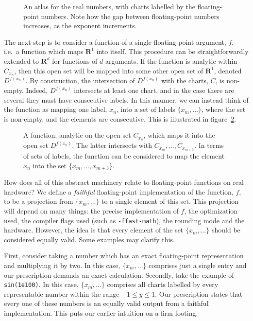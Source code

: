 \documentclass[prd,twocolumn,amsmath,amssymb,nofootinbib,eqsecnum]{revtex4-1}
\newcommand{\code}[1]{{\tt #1}}
\newcommand{\ie}{i.e.}
\newcommand{\fig}[1]{figure~\ref{fig:#1}}
\begin{document}
\begin{figure}[h]
\begin{center}
\resizebox{25em}{!}{}
\caption{An atlas for the real numbers, with charts labelled by the floating-point numbers. Note how the gap between floating-point numbers increases, as the exponent increments.}
\label{fig:R1}
\end{center}
\end{figure}

The next step is to consider a function of a single floating-point argument, $f$, \ie\ a function which maps $\mathbf{R}^1$ into itself. This procedure can be straightforwardly extended to $\mathbf{R}^d$ for functions of $d$ arguments. If the function is analytic within $C_{x_n}$, then this open set will be mapped into some other open set of $\mathbf{R}^1$, denoted $D^{f(x_n)}$. By construction, the intersection of $D^{f(x_n)}$ with the charts, $C$, is non-empty. Indeed, $D^{f(x_n)}$ intersects at least one chart, and in the case there are several they must have consecutive labels. In this manner, we can instead think of the function as mapping one label, $x_n$, into a set of labels $\{x_{m}, \ldots\}$, where the set is non-empty, and the elements are consecutive. This is illustrated in \fig{Function}.

\begin{figure}[h]
\begin{center}
\resizebox{25em}{!}{}
\caption{A function, analytic on the open set $C_{x_n}$, which maps it into the open set $D^{f(x_n)}$. The latter intersects with $C_{x_m}, \ldots, C_{x_{m+3}}$. In terms of sets of labels, the function can be considered to map the element $x_n$ into the set $\{x_m, \ldots, x_{m+3}\}$.}
\label{fig:Function}
\end{center}
\end{figure}

How does all of this abstract machinery relate to floating-point functions on real hardware? We define a \emph{faithful} floating-point implementation of the function, $f$, to be a projection from $\{x_{m}, \ldots\}$ to a single element of this set. This projection will depend on many things: the precise implementation of $f$, the optimization used, the compiler flags used (such as \code{-ffast-math}), the rounding mode and the hardware. However, the idea is that every element of the set $\{x_{m}, \ldots\}$ should be considered equally valid. Some examples may clarify this.

First, consider taking a number which has an exact floating-point representation and multiplying it by two.
In this case, $\{x_{m}, \ldots\}$ comprises just a single entry and our prescription demands an exact calculation. Secondly, take the example of \code{sin(1e100)}. In this case, $\{x_{m}, \ldots\}$ comprises all charts labelled by every representable number within the range $-1 \leq y \leq 1$. Our prescription states that every one of these numbers is an equally valid output from a faithful implementation. This puts our earlier intuition on a firm footing.
\end{document}
